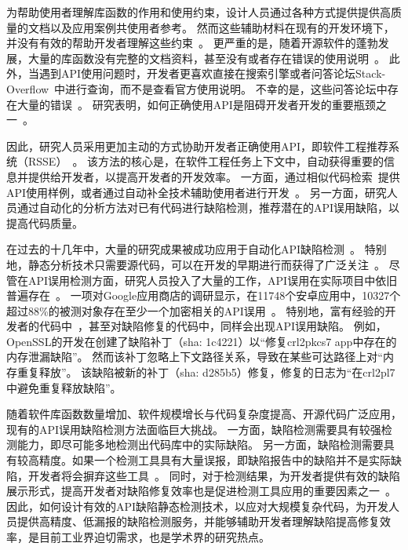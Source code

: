 



为帮助使用者理解库函数的作用和使用约束，设计人员通过各种方式提供提供高质量的文档以及应用案例共使用者参考。
然而这些辅助材料在现有的开发环境下，并没有有效的帮助开发者理解这些约束~\cite{09-icse-doc}。
更严重的是，随着开源软件的蓬勃发展，大量的库函数没有完整的文档资料，甚至没有或者存在错误的使用说明~\cite{15-ieee-doc-fail, 17-icse-api-doc}。
此外，当遇到API使用问题时，开发者更喜欢直接在搜索引擎或者问答论坛Stack-Overflow~\cite{stackoverflow}中进行查询，而不是查看官方使用说明。
不幸的是，这些问答论坛中存在大量的错误~\cite{16-sp-stack}。
研究表明，如何正确使用API是阻碍开发者开发的重要瓶颈之一~\cite{16-icse-cry}。


因此，研究人员采用更加主动的方式协助开发者正确使用API，即软件工程推荐系统（RSSE）~\cite{10-ieee-rsse}。
该方法的核心是，在软件工程任务上下文中，自动获得重要的信息并提供给开发者，以提高开发者的开发效率。
一方面，通过相似代码检索~\cite{05-icse-rec,16-icse-doc-stack,14-msr-stack}提供API使用样例，或者通过自动补全技术辅助使用者进行开发~\cite{15-tosem-code-cplt}。
另一方面，研究人员通过自动化的分析方法对已有代码进行缺陷检测，推荐潜在的API误用缺陷，以提高代码质量。


在过去的十几年中，大量的研究成果被成功应用于自动化API缺陷检测~\cite{15-coufless-static-survey,18-icse-saful,survey18}。
特别地，静态分析技术只需要源代码，可以在开发的早期进行而获得了广泛关注~\cite{05-icse-static}。
尽管在API误用检测方面，研究人员投入了大量的工作，API误用在实际项目中依旧普遍存在~\cite{16-ase-spec, 18-icse-stack}。
一项对Google应用商店的调研显示，在11748个安卓应用中，10327个超过88\%的被测对象存在至少一个加密相关的API误用~\cite{13-ccs-misuse}。
特别地，富有经验的开发者的代码中~\cite{18-soups-api-blind}，甚至对缺陷修复的代码中，同样会出现API误用缺陷。
例如，OpenSSL的开发在创建了缺陷补丁（sha: 1c4221）以``修复crl2pkcs7 app中存在的内存泄漏缺陷''。
然而该补丁忽略上下文路径关系，导致在某些可达路径上对``内存重复释放''。
该缺陷被新的补丁（sha: d285b5）修复，修复的日志为``在crl2pl7中避免重复释放缺陷''。


随着软件库函数数量增加、软件规模增长与代码复杂度提高、开源代码广泛应用，现有的API误用缺陷检测方法面临巨大挑战。
一方面，缺陷检测需要具有较强检测能力，即尽可能多地检测出代码库中的实际缺陷。
另一方面，缺陷检测需要具有较高精度。如果一个检测工具具有大量误报，即缺陷报告中的缺陷并不是实际缺陷，开发者将会摒弃这些工具~\cite{10-acm-precision}。
同时，对于检测结果，为开发者提供有效的缺陷展示形式，提高开发者对缺陷修复效率也是促进检测工具应用的重要因素之一~\cite{13-icse-donotuse}。
因此，如何设计有效的API缺陷静态检测技术，以应对大规模复杂代码，为开发人员提供高精度、低漏报的缺陷检测服务，并能够辅助开发者理解缺陷提高修复效率，是目前工业界迫切需求，也是学术界的研究热点。

